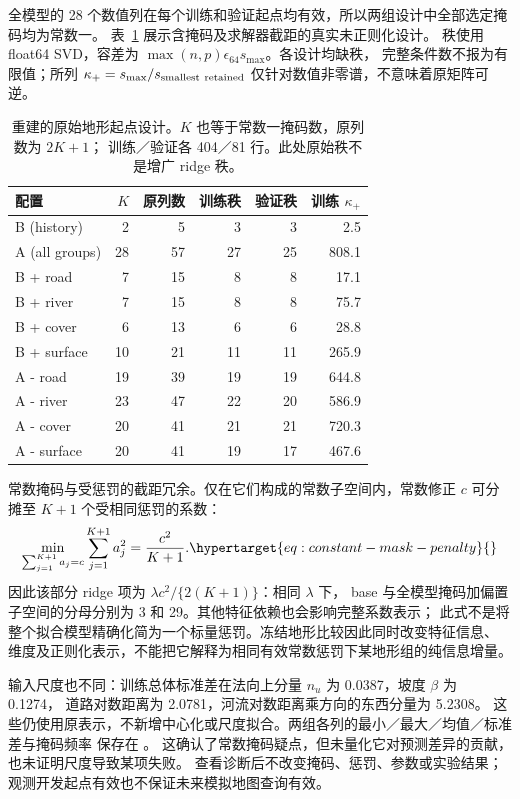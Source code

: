 全模型的 28 个数值列在每个训练和验证起点均有效，所以两组设计中全部选定掩码均为常数一。
表~\ref{tab:raw-terrain-design} 展示含掩码及求解器截距的真实未正则化设计。
秩使用 float64 SVD，容差为 \(\max(n,p)\epsilon_{64}s_{\max}\)。各设计均缺秩，
完整条件数不报为有限值；所列 \(\kappa_{+}=s_{\max}/s_{\rm smallest\ retained}\)
仅针对数值非零谱，不意味着原矩阵可逆。

\begin{table}[htbp]
\centering\small
\caption{重建的原始地形起点设计。\(K\) 也等于常数一掩码数，原列数为 \(2K+1\)；
训练／验证各 404／81 行。此处原始秩不是增广 ridge 秩。}
\label{tab:raw-terrain-design}\hypertarget{tab:raw-terrain-design}{}
\begin{tabular}{lrrrrr}
\toprule
配置 & \(K\) & 原列数 & 训练秩 & 验证秩 & 训练 \(\kappa_{+}\)\\
\midrule
B (history) & 2 & 5 & 3 & 3 & 2.5\\
A (all groups) & 28 & 57 & 27 & 25 & 808.1\\
B + road & 7 & 15 & 8 & 8 & 17.1\\
B + river & 7 & 15 & 8 & 8 & 75.7\\
B + cover & 6 & 13 & 6 & 6 & 28.8\\
B + surface & 10 & 21 & 11 & 11 & 265.9\\
A - road & 19 & 39 & 19 & 19 & 644.8\\
A - river & 23 & 47 & 22 & 20 & 586.9\\
A - cover & 20 & 41 & 21 & 21 & 720.3\\
A - surface & 20 & 41 & 19 & 17 & 467.6\\
\bottomrule
\end{tabular}
\end{table}

常数掩码与受惩罚的截距冗余。仅在它们构成的常数子空间内，常数修正 \(c\)
可分摊至 \(K+1\) 个受相同惩罚的系数：
\begin{equation}
\min_{\sum_{j=1}^{K+1}a_j=c}\sum_{j=1}^{K+1}a_j^2=\frac{c^2}{K+1}.
\label{eq:constant-mask-penalty}\hypertarget{eq:constant-mask-penalty}{}
\end{equation}
因此该部分 ridge 项为 \(\lambda c^2/\{2(K+1)\}\)：相同 \(\lambda\) 下，
base 与全模型掩码加偏置子空间的分母分别为 3 和 29。其他特征依赖也会影响完整系数表示；
此式不是将整个拟合模型精确化简为一个标量惩罚。冻结地形比较因此同时改变特征信息、
维度及正则化表示，不能把它解释为相同有效常数惩罚下某地形组的纯信息增量。

\noindent\parbox{\linewidth}{
输入尺度也不同：训练总体标准差在法向上分量 \(n_u\) 为 0.0387，坡度 \(\beta\) 为 0.1274，
道路对数距离为 2.0781，河流对数距离乘方向的东西分量为 5.2308。
这些仍使用原表示，不新增中心化或尺度拟合。两组各列的最小／最大／均值／标准差与掩码频率
保存在 。
这确认了常数掩码疑点，但未量化它对预测差异的贡献，也未证明尺度导致某项失败。
查看诊断后不改变掩码、惩罚、参数或实验结果；观测开发起点有效也不保证未来模拟地图查询有效。
}

